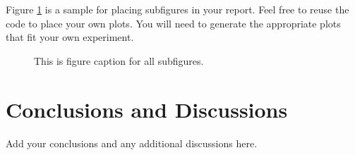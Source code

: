 \documentclass[
]{article}
\begin{document}
Figure \ref{fig:fig2} is a sample for placing subfigures in your report. Feel free to reuse the code to place your own plots. You will need to generate the appropriate plots that fit your own experiment.

\begin{figure}

{\centering {}

}

\caption{This is figure caption for all subfigures.}\label{fig:fig2}
\end{figure}

\hypertarget{conclusions-and-discussions}{%
\section{Conclusions and Discussions}\label{conclusions-and-discussions}}

Add your conclusions and any additional discussions here.
\end{document}
